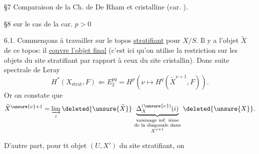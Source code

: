 \S 7 Comparaison de la Ch. de De Rham et cristalline (car. ).

\S 8   sur le cas de la car. $p>0$



6.1. Commençons à travailler sur le topos \uline{stratifiant} pour $X/S$. Il y a l'objet $\widetilde X$ de ce topos: il \uline{couvre l'objet final} (c'est ici qu'on utilise la restriction sur les objets du site stratifiant par rapport à ceux du site cristallin). Donc suite spectrale de Leray
\[
H^*(X_{\mathrm{strat}},F)\Longleftarrow E_2^{pq}
=H^p(\nu\mapsto H^q(\widetilde X^{\nu+1},F)).
\]
Or on constate que
\[
\widetilde X^{\unsure{\nu}+1}
=\varinjlim_i\deleted{\unsure{\widetilde X}}\,
\underbrace{\Delta_X^{(\unsure{\nu})}(i)}_{
\substack{\text{voisinage inf. ième}\\
\text{de la diagonale dans}\\
X^{\nu+1}}}
\,\deleted{\unsure{X}}.
\]

D'autre part, pour tt objet $(U,X')$ du site stratifiant, on 

